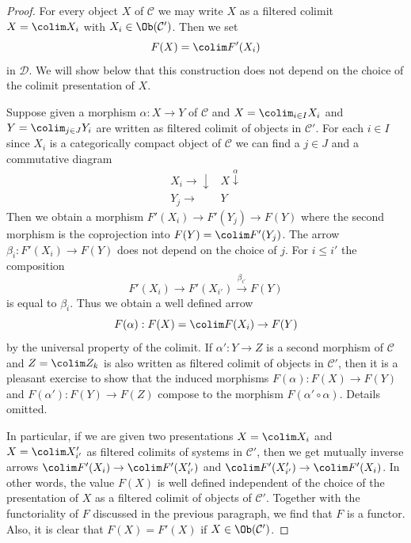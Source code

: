 \begin{proof}
For every object $X$ of $\mathcal{C}$ we may write $X$ as a filtered
colimit $X = \colim X_i$ with $X_i \in \Ob(\mathcal{C}')$. Then we set
$$
F(X) = \colim F'(X_i)
$$
in $\mathcal{D}$. We will show below that this construction does not
depend on the choice of the colimit presentation of $X$.

\medskip\noindent
Suppose given a morphism $\alpha : X \to Y$ of $\mathcal{C}$
and $X = \colim_{i \in I} X_i$ and $Y = \colim_{j \in J} Y_i$
are written as filtered colimit of objects in $\mathcal{C}'$.
For each $i \in I$ since $X_i$ is a categorically compact object of
$\mathcal{C}$ we can find a $j \in J$ and a commutative diagram
$$
\begin{array}{cc}X_i \longrightarrow\downarrow & X \overset{\alpha}{\downarrow} \\ Y_j \longrightarrow & Y\end{array}
$$
Then we obtain a morphism $F'(X_i) \to F'(Y_j) \to F(Y)$ where the second
morphism is the coprojection into $F(Y) = \colim F'(Y_j)$. The arrow
$\beta_i : F'(X_i) \to F(Y)$ does not depend on the choice of $j$.
For $i \leq i'$ the composition
$$
F'(X_i) \to F'(X_{i'}) \xrightarrow{\beta_{i'}} F(Y)
$$
is equal to $\beta_i$. Thus we obtain a well defined arrow
$$
F(\alpha) : F(X) = \colim F(X_i) \to F(Y)
$$
by the universal property of the colimit. If $\alpha' : Y \to Z$ is a
second morphism of $\mathcal{C}$ and $Z = \colim Z_k$ is also
written as filtered colimit of objects in $\mathcal{C}'$, then
it is a pleasant exercise to show that the induced
morphisms $F(\alpha) : F(X) \to F(Y)$ and $F(\alpha') : F(Y) \to F(Z)$
compose to the morphism $F(\alpha' \circ \alpha)$. Details omitted.

\medskip\noindent
In particular, if we are given two presentations
$X = \colim X_i$ and $X = \colim X'_{i'}$ as filtered
colimits of systems in $\mathcal{C}'$, then we get mutually inverse
arrows $\colim F'(X_i) \to \colim F'(X'_{i'})$ and
$\colim F'(X'_{i'}) \to \colim F'(X_i)$. In other words, the
value $F(X)$ is well defined independent of the choice of the
presentation of $X$ as a filtered colimit of objects of $\mathcal{C}'$.
Together with the functoriality of $F$ discussed in the previous
paragraph, we find that $F$ is a functor. Also, it is clear that
$F(X) = F'(X)$ if $X \in \Ob(\mathcal{C}')$.


\end{proof}
